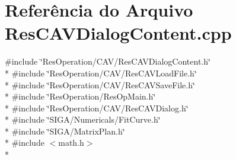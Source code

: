 \section{Referência do Arquivo Res\+C\+A\+V\+Dialog\+Content.\+cpp}
\label{_c_a_v_2_res_c_a_v_dialog_content_8cpp}
{\ttfamily \#include \char`\"{}Res\+Operation/\+C\+A\+V/\+Res\+C\+A\+V\+Dialog\+Content.\+h\char`\"{}}\\*
{\ttfamily \#include \char`\"{}Res\+Operation/\+C\+A\+V/\+Res\+C\+A\+V\+Load\+File.\+h\char`\"{}}\\*
{\ttfamily \#include \char`\"{}Res\+Operation/\+C\+A\+V/\+Res\+C\+A\+V\+Save\+File.\+h\char`\"{}}\\*
{\ttfamily \#include \char`\"{}Res\+Operation/\+Res\+Op\+Main.\+h\char`\"{}}\\*
{\ttfamily \#include \char`\"{}Res\+Operation/\+C\+A\+V/\+Res\+C\+A\+V\+Dialog.\+h\char`\"{}}\\*
{\ttfamily \#include \char`\"{}S\+I\+G\+A/\+Numericals/\+Fit\+Curve.\+h\char`\"{}}\\*
{\ttfamily \#include \char`\"{}S\+I\+G\+A/\+Matrix\+Plan.\+h\char`\"{}}\\*
{\ttfamily \#include $<$math.\+h$>$}\\*
